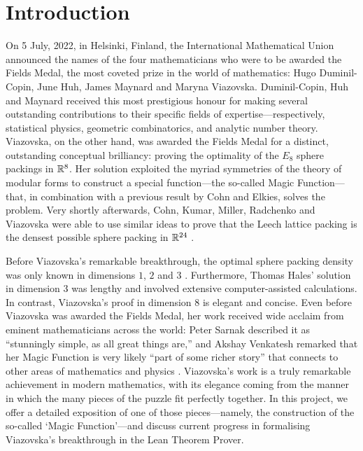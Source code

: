 \chapter{Introduction}
\label{Ch1:Chapter}
\thispagestyle{empty}

On 5 July, 2022, in Helsinki, Finland, the International Mathematical Union announced the names of the four mathematicians who were to be awarded the Fields Medal, the most coveted prize in the world of mathematics: Hugo Duminil-Copin, June Huh, James Maynard and Maryna Viazovska. Duminil-Copin, Huh and Maynard received this most prestigious honour for making several outstanding contributions to their specific fields of expertise---respectively, statistical physics, geometric combinatorics, and analytic number theory. Viazovska, on the other hand, was awarded the Fields Medal for a distinct, outstanding conceptual brilliancy: proving the optimality of the $E_8$ sphere packings in $\mathbb{R}^8$. Her solution \cite{Viazovska8} exploited the myriad symmetries of the theory of modular forms to construct a special function---the so-called Magic Function---that, in combination with a previous result by Cohn and Elkies, solves the problem. Very shortly afterwards, Cohn, Kumar, Miller, Radchenko and Viazovska were able to use similar ideas to prove that the Leech lattice packing is the densest possible sphere packing in $\mathbb{R}^{24}$ \cite{Viazovska24}.

Before Viazovska's remarkable breakthrough, the optimal sphere packing density was only known in dimensions $1$, $2$ and $3$ \cite{CohnOnViazovskaICM}. Furthermore, Thomas Hales' solution in dimension $3$ \cite{HalesKeplerInformal} was lengthy and involved extensive computer-assisted calculations. In contrast, Viazovska's proof in dimension $8$ is elegant and concise. Even before Viazovska was awarded the Fields Medal, her work received wide acclaim from eminent mathematicians across the world: Peter Sarnak described it as ``stunningly simple, as all great things are,'' and Akshay Venkatesh remarked that her Magic Function is very likely ``part of some richer story'' that connects to other areas of mathematics and physics \cite{QuantaPiece}. Viazovska's work is a truly remarkable achievement in modern mathematics, with its elegance coming from the manner in which the many pieces of the puzzle fit perfectly together. In this project, we offer a detailed exposition of one of those pieces---namely, the construction of the so-called `Magic Function'---and discuss current progress in formalising Viazovska's breakthrough in the Lean Theorem Prover.




